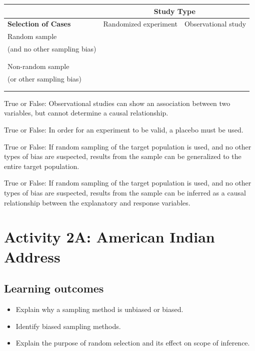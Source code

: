 \documentclass[
]{report}
\newcommand{\rgs}{\vspace{12pt}} %
\begin{document}
\begin{center}
\begin{tabular}{|p{2in}|p{2in}|p{2in}|}
\hline
 & \multicolumn{2}{|c|}{\textbf{Study Type}} \\ \hline
 \textbf{Selection of Cases} & Randomized experiment & Observational study \\ \hline
 Random sample && \\ 
 (and no other sampling bias) & & \\ 
  & & \\
   & & \\ \hline
   Non-random sample && \\ 
   (or other sampling bias) & & \\ 
  & & \\
   & & \\ \hline
\end{tabular}
\end{center}

\rgs

True or False: Observational studies can show an association between two variables, but cannot determine a causal relationship.

True or False: In order for an experiment to be valid, a placebo must be used.

True or False: If random sampling of the target population is used, and no other types of bias are suspected, results from the sample can be generalized to the entire target population.

True or False: If random sampling of the target population is used, and no other types of bias are suspected, results from the sample can be inferred as a causal relationship between the explanatory and response variables.

\newpage

\hypertarget{activity-2a-american-indian-address}{%
\section{Activity 2A: American Indian Address}\label{activity-2a-american-indian-address}}


\hypertarget{learning-outcomes-1}{%
\subsection{Learning outcomes}\label{learning-outcomes-1}}

\begin{itemize}
\item
  Explain why a sampling method is unbiased or biased.
\item
  Identify biased sampling methods.
\item
  Explain the purpose of random selection and its effect on scope of inference.
\end{itemize}
\end{document}
